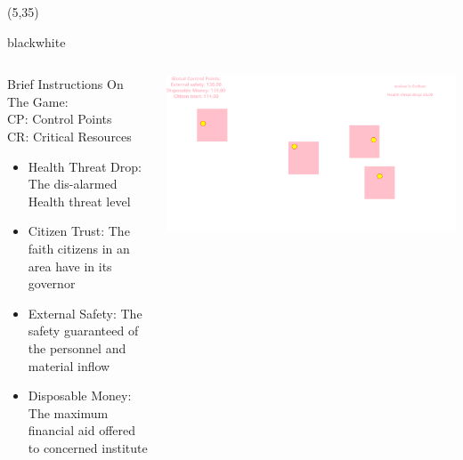 \documentclass[hyperref={pdfpagelabels=false}]{beamer}
\begin{document}
\begin{frame}
	\begin{textblock}{90}(5,35)
		\begin{baseroundedbox}[]{black}{white}
			\begin{columns}
			\Large{	\begin{column}{0.55\columnwidth}
					Brief Instructions On The Game: \\
					CP: Control Points\\
					CR: Critical Resources\\
					\begin{multicols}{2}
						\begin{itemize}
							\item Health Threat Drop: The dis-alarmed Health threat level
							\item Citizen Trust: The faith citizens in an area have in its governor
							\item External Safety: The safety guaranteed of the personnel and material inflow
							\item Disposable Money: The maximum financial aid offered to concerned institute
						\end{itemize}
					\end{multicols}
				\end{column}
				\begin{column}{0.5\columnwidth}
					\centering
					\includegraphics[width=0.9\columnwidth]{img/WechatIMG1131}
				\end{column}}
			\end{columns}

		\end{baseroundedbox}
	\end{textblock}
	

\end{frame}
\end{document}
